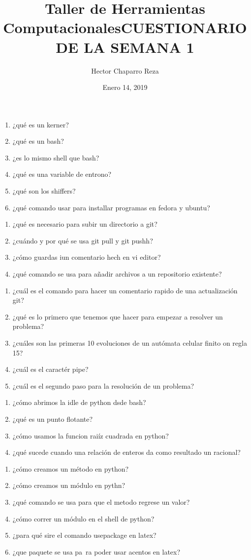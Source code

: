 \documentclass[letterpaper, 12pt, oneside]{article}
\title{\Huge{Taller de Herramientas Computacionales}}
\author{Hector Chaparro Reza}
\date{Enero 14, 2019}
\begin{document}
	\title{\Huge{CUESTIONARIO DE LA SEMANA 1}}	
	\begin{enumerate}
		\item ¿qu\'e es un kerner?
		\item ¿qu\'e es un bash?
		\item ¿es lo mismo shell que bash?
		\item ¿qu\'e es una variable de entrono?
		\item ¿qu\'e son los shiffers?
		\item ¿qu\'e comando usar para installar programas en fedora y ubuntu?
	\end{enumerate}

	\begin{enumerate}
		\item ¿qu\'e es necesario para subir un directorio a git?
		\item ¿cu\'ando y por qu\'e se usa git pull y git pushh?
		\item ¿c\'omo guardas iun comentario hech en vi editor?
		\item ¿qu\'e comando se usa para añadir archivos a un repositorio existente?
	\end{enumerate}

	\begin{enumerate}
		\item ¿cu\'al es el comando para hacer un comentario rapido de una actualizaci\'on git?
		\item ¿qu\'e es lo primero que tenemos que hacer para empezar a resolver un problema?
		\item ¿cu\'ales son las primeras 10 evoluciones de un aut\'omata celular finito on regla 15?
		\item ¿cu\'al es el caract\'er pipe?
		\item ¿cu\'al es el segundo paso para la resoluci\'on de un problema?
	\end{enumerate}
	\begin{enumerate}
		\item ¿c\'omo abrimos la idle de python dsde bash?
		\item ¿qu\'e es un punto flotante?
		\item ¿c\'omo usamos la funcion rai\'iz cuadrada en python?
		\item ¿qu\'e sucede cuando una relaci\'on de enteros da como resultado un racional?
	\end{enumerate}
	\begin{enumerate}
		\item ¿c\'omo creamos un m\'etodo en python?
		\item ¿c\'omo creamos un m\'odulo en pythn?
		\item ¿qu\'e comando se usa para que el metodo regrese un valor?
		\item ¿c\'omo correr un m\'odulo en el shell de python?
		\item ¿para qu\'e sire el comando usepackage en latex?
		\item ¿que paquete se usa pa~ra poder usar acentos en latex?
	\end{enumerate}
\end{document}
